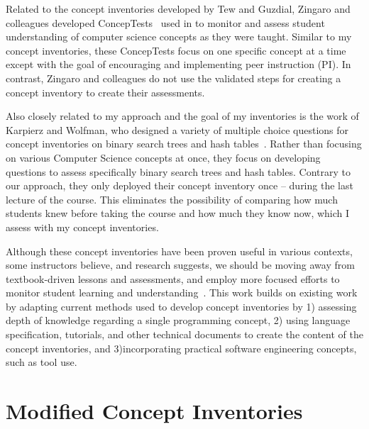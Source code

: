 Related to the concept inventories developed by Tew and Guzdial, Zingaro and colleagues developed ConcepTests~\cite{zingaro2010experience} used in to monitor and assess student understanding of computer science concepts as they were taught. Similar to my concept inventories, these ConcepTests focus on one specific concept at a time except with the goal of encouraging and implementing peer instruction (PI). In contrast, Zingaro and colleagues do not use the validated steps for creating a concept inventory to create their assessments.
	
Also closely related to my approach and the goal of my inventories is the work of Karpierz and Wolfman, who designed a variety of multiple choice questions for concept inventories on binary search trees and hash tables~\cite{Karpierz2014Misconception}. Rather than focusing on various Computer Science concepts at once, they focus on developing questions to assess specifically binary search trees and hash tables. Contrary to our approach, they only deployed their concept inventory once -- during the last lecture of the course. This eliminates the possibility of comparing how much students knew before taking the course and how much they know now, which I assess with my concept inventories.
	
Although these concept inventories have been proven useful in various contexts, some instructors believe, and research suggests, we should be moving away from textbook-driven lessons and assessments, and employ more focused efforts to monitor student learning and understanding~\cite{pellegrino2001knowing, ghezzi2005challenges, wohlin1999achieving}. This work builds on existing work by adapting current methods used to develop concept inventories by 1) assessing depth of knowledge regarding a single programming concept, 2) using language specification, tutorials, and other technical documents to create the content of the concept inventories, and 3)incorporating practical software engineering concepts, such as tool use.

\section{Modified Concept Inventories}

